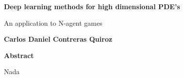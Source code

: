 

\fancyhf{} %
\fancyhead[RO,R]{\thepage} %
\renewcommand{\headrulewidth}{0pt}

\begin{center}
    \Large
    \textbf{Deep learning methods for high dimensional PDE's}
    
    \vspace{0.4cm}
    \large
    An application to N-agent games
    
    \vspace{0.4cm}
    \textbf{Carlos Daniel Contreras Quiroz}
    
    \vspace{0.9cm}
    \textbf{Abstract}
\end{center}
Nada